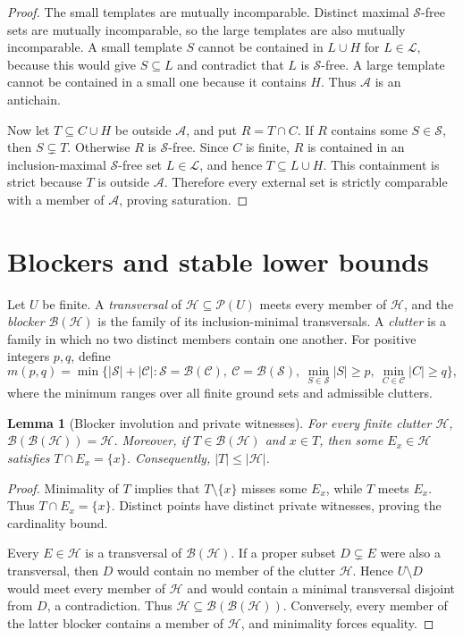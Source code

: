 \documentclass[11pt]{article}
\newtheorem{lemma}[theorem]{Lemma}
\theoremstyle{definition}
\theoremstyle{remark}
\newcommand{\powerset}{\mathcal{P}}
\newcommand{\smallcores}{\mathcal{S}}
\newcommand{\largecores}{\mathcal{L}}
\newcommand{\blocker}{\mathcal{B}}
\begin{document}
\begin{proof}
The small templates are mutually incomparable.  Distinct maximal
$\smallcores$-free sets are mutually incomparable, so the large templates are
also mutually incomparable.  A small template $S$ cannot be contained in
$L\cup H$ for $L\in\largecores$, because this would give $S\subseteq L$ and
contradict that $L$ is $\smallcores$-free.  A large template cannot be
contained in a small one because it contains $H$.  Thus $\mathcal A$ is an
antichain.

Now let $T\subseteq C\cup H$ be outside $\mathcal A$, and put $R=T\cap C$.
If $R$ contains some $S\in\smallcores$, then $S\subsetneq T$.  Otherwise $R$
is $\smallcores$-free.  Since $C$ is finite, $R$ is contained in an
inclusion-maximal $\smallcores$-free set $L\in\largecores$, and hence
$T\subseteq L\cup H$.  This containment is strict because $T$ is outside
$\mathcal A$.  Therefore every external set is strictly comparable with a
member of $\mathcal A$, proving saturation.
\end{proof}

\section{Blockers and stable lower bounds}
\label{sec:blockers}

Let $U$ be finite.  A \emph{transversal} of
$\mathcal H\subseteq\powerset(U)$ meets every member of $\mathcal H$, and the
\emph{blocker} $\blocker(\mathcal H)$ is the family of its inclusion-minimal
transversals.  A \emph{clutter} is a family in which no two distinct members
contain one another.  For positive integers $p,q$, define
\[
  m(p,q)=\min\bigl\{|\mathcal S|+|\mathcal C|:
  \mathcal S=\blocker(\mathcal C),\
  \mathcal C=\blocker(\mathcal S),\
  \min_{S\in\mathcal S}|S|\geq p,\
  \min_{C\in\mathcal C}|C|\geq q\bigr\},
\]
where the minimum ranges over all finite ground sets and admissible clutters.

\begin{lemma}[Blocker involution and private witnesses]
\label{lem:blocker-basic}
For every finite clutter $\mathcal H$,
$\blocker(\blocker(\mathcal H))=\mathcal H$.  Moreover, if
$T\in\blocker(\mathcal H)$ and $x\in T$, then some
$E_x\in\mathcal H$ satisfies $T\cap E_x=\{x\}$.  Consequently,
$|T|\leq|\mathcal H|$.
\end{lemma}

\begin{proof}
Minimality of $T$ implies that $T\setminus\{x\}$ misses some $E_x$, while
$T$ meets $E_x$.  Thus $T\cap E_x=\{x\}$.  Distinct points have distinct
private witnesses, proving the cardinality bound.

Every $E\in\mathcal H$ is a transversal of $\blocker(\mathcal H)$.  If a
proper subset $D\subsetneq E$ were also a transversal, then $D$ would contain
no member of the clutter $\mathcal H$.  Hence $U\setminus D$ would meet every
member of $\mathcal H$ and would contain a minimal transversal disjoint from
$D$, a contradiction.  Thus
$\mathcal H\subseteq\blocker(\blocker(\mathcal H))$.  Conversely, every
member of the latter blocker contains a member of $\mathcal H$, and
minimality forces equality.
\end{proof}
\end{document}
